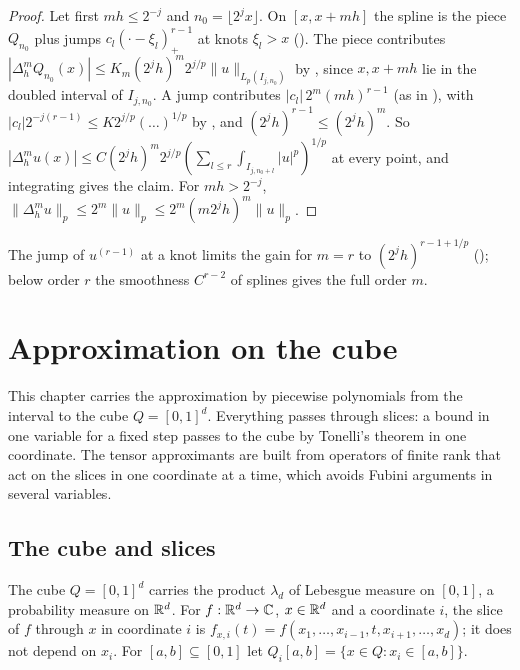 \begin{proof}
\leanok
Let first $mh \leq 2^{-j}$ and $n_0 = \lfloor 2^j x \rfloor$. On $[x, x + mh]$ the spline is the
piece $Q_{n_0}$ plus jumps $c_l (\cdot - \xi_l)_+^{r-1}$ at knots $\xi_l > x$
(). The piece contributes
$|\Delta_h^m Q_{n_0}(x)| \leq K_m (2^j h)^m 2^{j/p} \|u\|_{L_p(I_{j,n_0})}$ by
, since $x, x + mh$ lie in the doubled interval of $I_{j, n_0}$. A jump
contributes $|c_l| \, 2^m (mh)^{r-1}$ (as in ), with
$|c_l| 2^{-j(r-1)} \leq K 2^{j/p} (\dots)^{1/p}$ by , and
$(2^j h)^{r-1} \leq (2^j h)^m$. So
$|\Delta_h^m u(x)| \leq C (2^j h)^m 2^{j/p} (\sum_{l \leq r} \int_{I_{j,n_0+l}} |u|^p)^{1/p}$ at
every point, and integrating gives the claim. For $mh > 2^{-j}$,
$\|\Delta_h^m u\|_p \leq 2^m \|u\|_p \leq 2^m (m 2^j h)^m \|u\|_p$.
\end{proof}

The jump of $u^{(r-1)}$ at a knot limits the gain for $m = r$ to $(2^j h)^{r-1+1/p}$
(); below order $r$ the smoothness $C^{r-2}$ of splines gives the full
order $m$.

\chapter{Approximation on the cube}
\label{ch:cube}

This chapter carries the approximation by piecewise polynomials from the interval to the cube
$Q = [0, 1]^d$. Everything passes through slices: a bound in one variable for a fixed step passes
to the cube by Tonelli's theorem in one coordinate. The tensor approximants are built from
operators of finite rank that act on the slices in one coordinate at a time, which avoids
Fubini arguments in several variables.

\section{The cube and slices}

\begin{definition}
\label{def:cube}
\leanok
The cube $Q = [0, 1]^d$ carries the product $\lambda_d$ of Lebesgue measure on $[0, 1]$, a
probability measure on $\mathbb{R}^d$. For $f : \mathbb{R}^d \to \mathbb{C}$, $x \in \mathbb{R}^d$ and a coordinate $i$, the
slice of $f$ through $x$ in coordinate $i$ is $f_{x,i}(t) = f(x_1, \dots, x_{i-1}, t, x_{i+1},
\dots, x_d)$; it does not depend on $x_i$. For $[a, b] \subseteq [0, 1]$ let
$Q_i[a, b] = \{x \in Q : x_i \in [a, b]\}$.
\end{definition}

